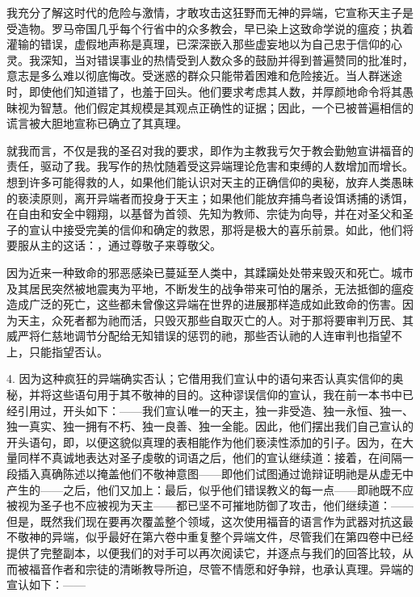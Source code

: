 我充分了解这时代的危险与激情，才敢攻击这狂野而无神的异端，它宣称天主子是受造物。罗马帝国几乎每个行省中的众多教会，早已染上这致命学说的瘟疫；执着灌输的错误，虚假地声称是真理，已深深嵌入那些虚妄地以为自己忠于信仰的心灵。我深知，当对错误事业的热情受到人数众多的鼓励并得到普遍赞同的批准时，意志是多么难以彻底悔改。受迷惑的群众只能带着困难和危险接近。当人群迷途时，即使他们知道错了，也羞于回头。他们要求考虑其人数，并厚颜地命令将其愚昧视为智慧。他们假定其规模是其观点正确性的证据；因此，一个已被普遍相信的谎言被大胆地宣称已确立了其真理。\par

就我而言，不仅是我的圣召对我的要求，即作为主教我亏欠于教会勤勉宣讲福音的责任，驱动了我。我写作的热忱随着受这异端理论危害和束缚的人数增加而增长。想到许多可能得救的人，如果他们能认识对天主的正确信仰的奥秘，放弃人类愚昧的亵渎原则，离开异端者而投身于天主；如果他们能放弃捕鸟者设饵诱捕的诱饵，在自由和安全中翱翔，以基督为首领、先知为教师、宗徒为向导，并在对圣父和圣子的宣认中接受完美的信仰和确定的救恩，那将是极大的喜乐前景。如此，他们将要服从主的这话：，通过尊敬子来尊敬父。\par

因为近来一种致命的邪恶感染已蔓延至人类中，其蹂躏处处带来毁灭和死亡。城市及其居民突然被地震夷为平地，不断发生的战争带来可怕的屠杀，无法抵御的瘟疫造成广泛的死亡，这些都未曾像这异端在世界的进展那样造成如此致命的伤害。因为天主，众死者都为祂而活，只毁灭那些自取灭亡的人。对于那将要审判万民、其威严将仁慈地调节分配给无知错误的惩罚的祂，那些否认祂的人连审判也指望不上，只能指望否认。\par

4. 因为这种疯狂的异端确实否认；它借用我们宣认中的语句来否认真实信仰的奥秘，并将这些语句用于其不敬神的目的。这种谬误信仰的宣认，我在前一本书中已经引用过，开头如下：——我们宣认唯一的天主，独一非受造、独一永恒、独一、独一真实、独一拥有不朽、独一良善、独一全能。因此，他们摆出我们自己宣认的开头语句，即，以便这貌似真理的表相能作为他们亵渎性添加的引子。因为，在大量同样不真诚地表达对圣子虔敬的词语之后，他们的宣认继续道：接着，在间隔一段插入真确陈述以掩盖他们不敬神意图——即他们试图通过诡辩证明祂是从虚无中产生的——之后，他们又加上：最后，似乎他们错误教义的每一点——即祂既不应被视为圣子也不应被视为天主——都已坚不可摧地防御了攻击，他们继续道：——但是，既然我们现在要再次覆盖整个领域，这次使用福音的语言作为武器对抗这最不敬神的异端，似乎最好在第六卷中重复整个异端文件，尽管我们在第四卷中已经提供了完整副本，以便我们的对手可以再次阅读它，并逐点与我们的回答比较，从而被福音作者和宗徒的清晰教导所迫，尽管不情愿和好争辩，也承认真理。异端的宣认如下：——\par

